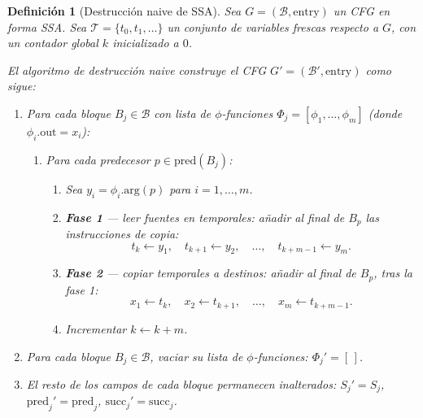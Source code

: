 \documentclass[12pt, a4paper]{article}
\newtheorem{definition}{Definición}[section]
\begin{document}
\begin{definition}[Destrucción naive de SSA]
\label{def:destruccion}
Sea $G = (\mathcal{B}, \mathrm{entry})$ un CFG en forma SSA.
Sea $\mathcal{T} = \{t_0, t_1, \ldots\}$ un conjunto de variables frescas respecto a $G$,
con un contador global $k$ inicializado a $0$.

El algoritmo de \emph{destrucción naive} construye el CFG $G' = (\mathcal{B}', \mathrm{entry})$
como sigue:

\begin{enumerate}
  \item Para cada bloque $B_j \in \mathcal{B}$ con lista de $\phi$-funciones
    $\Phi_j = [\phi_1, \ldots, \phi_m]$ (donde $\phi_i.\mathrm{out} = x_i$):

    \begin{enumerate}
      \item Para cada predecesor $p \in \mathrm{pred}(B_j)$:
        \begin{enumerate}
          \item Sea $y_i = \phi_i.\mathrm{arg}(p)$ para $i = 1, \ldots, m$.

          \item \textbf{Fase 1} --- leer fuentes en temporales: añadir al final de $B_p$
            las instrucciones de copia:
            \[
              t_k \leftarrow y_1, \quad t_{k+1} \leftarrow y_2, \quad \ldots,
              \quad t_{k+m-1} \leftarrow y_m.
            \]

          \item \textbf{Fase 2} --- copiar temporales a destinos: añadir al final de $B_p$,
            tras la fase 1:
            \[
              x_1 \leftarrow t_k, \quad x_2 \leftarrow t_{k+1}, \quad \ldots,
              \quad x_m \leftarrow t_{k+m-1}.
            \]

          \item Incrementar $k \leftarrow k + m$.
        \end{enumerate}
    \end{enumerate}

  \item Para cada bloque $B_j \in \mathcal{B}$, vaciar su lista de $\phi$-funciones:
    $\Phi_j' = [\,]$.

  \item El resto de los campos de cada bloque permanecen inalterados:
    $S_j' = S_j$, $\mathrm{pred}_j' = \mathrm{pred}_j$, $\mathrm{succ}_j' = \mathrm{succ}_j$.
\end{enumerate}
\end{definition}
\end{document}

